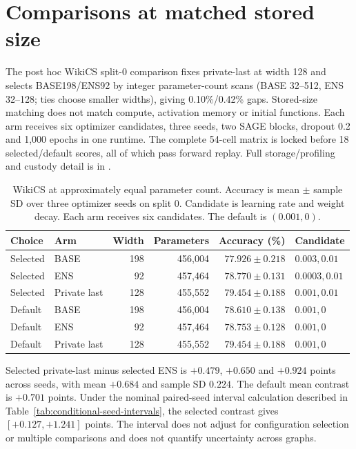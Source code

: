 \section{Comparisons at matched stored size}\label{app:matched-budget}
The post hoc WikiCS split-0 comparison fixes private-last at width 128 and selects BASE198/ENS92 by integer parameter-count scans (BASE 32--512, ENS 32--128; ties choose smaller widths), giving 0.10\%/0.42\% gaps. Stored-size matching does not match compute, activation memory or initial functions. Each arm receives six optimizer candidates, three seeds, two SAGE blocks, dropout 0.2 and 1,000 epochs in one runtime. The complete 54-cell matrix is locked before 18 selected/default scores, all of which pass forward replay. Full storage/profiling and custody detail is in .

\begin{table}[t]
\centering\small
\setlength{\tabcolsep}{4pt}
\caption{WikiCS at approximately equal parameter count. Accuracy is mean $\pm$ sample SD over three optimizer seeds on split 0. Candidate is learning rate and weight decay. Each arm receives six candidates. The default is $(0.001,0)$.}
\label{tab:wikics-matched-budget}
\begin{tabular}{llrrrl}
\toprule
Choice & Arm & Width & Parameters & Accuracy (\%) & Candidate\\
\midrule
Selected & BASE & 198 & 456,004 & $77.926 \pm 0.218$ & $0.003, 0.01$\\
Selected & ENS & 92 & 457,464 & $78.770 \pm 0.131$ & $0.0003, 0.01$\\
Selected & Private last & 128 & 455,552 & $79.454 \pm 0.188$ & $0.001, 0.01$\\
Default & BASE & 198 & 456,004 & $78.610 \pm 0.138$ & $0.001, 0$\\
Default & ENS & 92 & 457,464 & $78.753 \pm 0.128$ & $0.001, 0$\\
Default & Private last & 128 & 455,552 & $79.454 \pm 0.188$ & $0.001, 0$\\
\bottomrule
\end{tabular}
\end{table}

Selected private-last minus selected ENS is $+0.479$, $+0.650$ and
$+0.924$ points across seeds, with mean $+0.684$ and sample SD $0.224$.
The default mean contrast is $+0.701$ points. Under the nominal paired-seed
interval calculation described in Table~\ref{tab:conditional-seed-intervals},
the selected contrast gives $[+0.127,+1.241]$ points. The interval does
not adjust for configuration selection or multiple comparisons and does
not quantify uncertainty across graphs.

